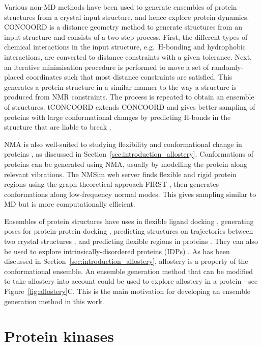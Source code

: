 Various non-MD methods have been used to generate ensembles of protein structures from a crystal input structure, and hence explore protein dynamics.
CONCOORD \cite{DeGroot1997, DeGroot1999} is a distance geometry method to generate structures from an input structure and consists of a two-step process.
First, the different types of chemical interactions in the input structure, e.g.\ H-bonding and hydrophobic interactions, are converted to distance constraints with a given tolerance.
Next, an iterative minimisation procedure is performed to move a set of randomly-placed coordinates such that most distance constraints are satisfied.
This generates a protein structure in a similar manner to the way a structure is produced from NMR constraints.
The process is repeated to obtain an ensemble of structures.
tCONCOORD extends CONCOORD and gives better sampling of proteins with large conformational changes by predicting H-bonds in the structure that are liable to break \cite{Seeliger2007}.

NMA is also well-suited to studying flexibility and conformational change in proteins \cite{Dobbins2008}, as discussed in Section~\ref{sec:introduction_allostery}.
Conformations of proteins can be generated using NMA, usually by modelling the protein along relevant vibrations.
The NMSim web server \cite{Kruger2012, Ahmed2011} finds flexible and rigid protein regions using the graph theoretical approach FIRST \cite{Jacobs2001}, then generates conformations along low-frequency normal modes.
This gives sampling similar to MD but is more computationally efficient.

Ensembles of protein structures have uses in flexible ligand docking \cite{Totrov2008}, generating poses for protein-protein docking \cite{Mustard2005}, predicting structures on trajectories between two crystal structures \cite{Weiss2009}, and predicting flexible regions in proteins \cite{Ahmed2011}.
They can also be used to explore intrinsically-disordered proteins (IDPs) \cite{Tompa2012, Best2017}.
As has been discussed in Section~\ref{sec:introduction_allostery}, allostery is a property of the conformational ensemble.
An ensemble generation method that can be modified to take allostery into account could be used to explore allostery in a protein - see Figure~\ref{fig:allostery}C.
This is the main motivation for developing an ensemble generation method in this work.


\section{Protein kinases}
\label{sec:introduction_kinases}

